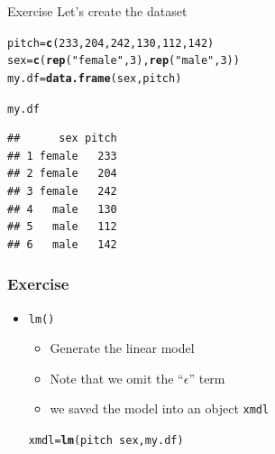 \documentclass[10p]{beamer}\usepackage[]{graphicx}\usepackage[]{color}
\makeatletter
\newcommand{\hlnum}[1]{\textcolor[rgb]{0.686,0.059,0.569}{#1}}%
\newcommand{\hlstr}[1]{\textcolor[rgb]{0.192,0.494,0.8}{#1}}%
\newcommand{\hlopt}[1]{\textcolor[rgb]{0,0,0}{#1}}%
\newcommand{\hlstd}[1]{\textcolor[rgb]{0.345,0.345,0.345}{#1}}%
\newcommand{\hlkwb}[1]{\textcolor[rgb]{0.69,0.353,0.396}{#1}}%
\newcommand{\hlkwd}[1]{\textcolor[rgb]{0.737,0.353,0.396}{\textbf{#1}}}%
\newenvironment{kframe}{%
 \def\at@end@of@kframe{}%
 \ifinner\ifhmode%
  \def\at@end@of@kframe{\end{minipage}}%
  \begin{minipage}{\columnwidth}%
 \fi\fi%
 \def\FrameCommand##1{\hskip\@totalleftmargin \hskip-\fboxsep
 \colorbox{shadecolor}{##1}\hskip-\fboxsep
     \hskip-\linewidth \hskip-\@totalleftmargin \hskip\columnwidth}%
 \MakeFramed {\advance\hsize-\width
   \@totalleftmargin\z@ \linewidth\hsize
   \@setminipage}}%
 {\par\unskip\endMakeFramed%
 \at@end@of@kframe}
\newenvironment{knitrout}{}{} %
\makeatother
\begin{document}
\begin{frame}[fragile]{Exercise}
Let's create the dataset
\begin{knitrout}
\color{fgcolor}\begin{kframe}
\begin{alltt}
\hlstd{pitch} \hlkwb{=} \hlkwd{c}\hlstd{(}\hlnum{233}\hlstd{,}\hlnum{204}\hlstd{,}\hlnum{242}\hlstd{,}\hlnum{130}\hlstd{,}\hlnum{112}\hlstd{,}\hlnum{142}\hlstd{)}
\hlstd{sex} \hlkwb{=} \hlkwd{c}\hlstd{(}\hlkwd{rep}\hlstd{(}\hlstr{"female"}\hlstd{,}\hlnum{3}\hlstd{),}\hlkwd{rep}\hlstd{(}\hlstr{"male"}\hlstd{,}\hlnum{3}\hlstd{))}
\hlstd{my.df} \hlkwb{=} \hlkwd{data.frame}\hlstd{(sex, pitch)}
\end{alltt}
\end{kframe}
\end{knitrout}

\pause

\begin{knitrout}
\color{fgcolor}\begin{kframe}
\begin{alltt}
\hlstd{my.df}
\end{alltt}
\begin{verbatim}
##      sex pitch
## 1 female   233
## 2 female   204
## 3 female   242
## 4   male   130
## 5   male   112
## 6   male   142
\end{verbatim}
\end{kframe}
\end{knitrout}
\end{frame}

\begin{frame}[fragile]
\frametitle{Exercise}
\begin{itemize}
\item \texttt{lm()}
	\begin{itemize}
	\item Generate the linear model
	\item Note that we omit the ``$\epsilon$'' term 
	\item we saved the model into an object \texttt{xmdl}
	\end{itemize}
\pause
\begin{knitrout}
\color{fgcolor}\begin{kframe}
\begin{alltt}
\hlstd{xmdl} \hlkwb{=} \hlkwd{lm}\hlstd{(pitch} \hlopt{~} \hlstd{sex, my.df)}
\end{alltt}
\end{kframe}
\end{knitrout}
\end{itemize}
\end{frame}
\end{document}
